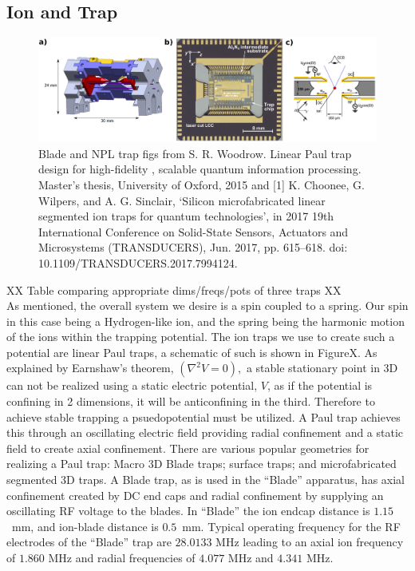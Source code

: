 \documentclass[12pt]{iopart}
\begin{document}
\subsection{Ion and Trap}

\begin{figure}
  \begin{center}
   \noindent\includegraphics[width=\linewidth]{figures/trap_comp.png}
  \end{center}
  \caption{Blade and NPL trap
  figs from S. R. Woodrow. Linear Paul trap design for high-fidelity ,
  scalable quantum information processing. Master’s thesis, University
  of Oxford, 2015 and [1] K. Choonee, G. Wilpers, and A. G. Sinclair,
  ‘Silicon microfabricated linear segmented ion traps for quantum
  technologies’, in 2017 19th International Conference on Solid-State
  Sensors, Actuators and Microsystems (TRANSDUCERS), Jun. 2017,
  pp. 615–618. doi: 10.1109/TRANSDUCERS.2017.7994124.}

  \label{fig:trap}
\end{figure}

XX Table comparing appropriate dims/freqs/pots of three traps XX\\

As mentioned, the overall system we desire is a spin coupled to a
spring. Our spin in this case being a Hydrogen-like ion, and the
spring being the harmonic motion of the ions within the trapping
potential. The ion traps we use to create such a potential are linear
Paul traps, a schematic of such is shown in FigureX. As explained by
Earnshaw's theorem, $(\nabla^2 V = 0),$
a stable stationary point in 3D can not be realized using a static
electric potential, $V$, as if the potential is confining in 2
dimensions, it will be anticonfining in the third. Therefore to
achieve stable trapping a psuedopotential must be utilized.
A Paul trap achieves this through an oscillating electric field
providing radial confinement and a static field to create axial
confinement. There are various popular geometries for realizing a Paul
trap: Macro 3D Blade traps; surface traps; and microfabricated
segmented 3D traps.  A Blade trap, as is used in the ``Blade''
apparatus, has axial confinement created by DC end caps and radial
confinement by supplying an oscillating RF voltage to the blades. In
``Blade'' the ion endcap distance is $1.15$~mm, and ion-blade distance
is $0.5$~mm. Typical operating frequency for the RF electrodes of the
``Blade'' trap are $28.0133$ MHz leading to an axial ion frequency of
$1.860$ MHz and radial frequencies of $4.077$ MHz and $4.341$ MHz.
\end{document}
